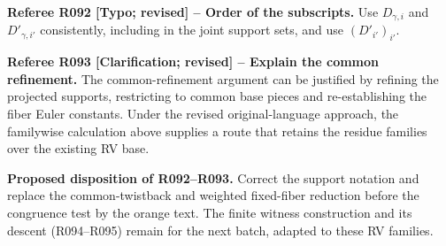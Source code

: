 \documentclass[12pt]{amsart}
\theoremstyle{remark}
\theoremstyle{definition}
\numberwithin{equation}{section}
\theoremstyle{plain}
\begin{document}
\medskip
{\normalfont\small\color{RefereePurple}
\noindent\textbf{Referee R092 [Typo; revised] --
Order of the subscripts.}
Use $D_{\gamma,i}$ and $D'_{\gamma,i'}$ consistently,
including in the joint support sets, and use
$(D'_{i'})_{i'}$.\par
\medskip
\noindent\textbf{Referee R093 [Clarification; revised] --
Explain the common refinement.}
The common-refinement argument can be justified by
refining the projected supports, restricting to common
base pieces and re-establishing the fiber Euler constants.
Under the revised original-language approach, the
familywise calculation above supplies a route that
retains the residue families over the existing RV base.\par}
\medskip
{\normalfont\small\color{ProposalOrange}
\noindent\textbf{Proposed disposition of R092--R093.}
Correct the support notation and replace the common-twistback
and weighted fixed-fiber reduction before the congruence test
by the orange text. The finite witness construction and its
descent (R094--R095) remain for the next batch, adapted to
these RV families.}
\end{document}
